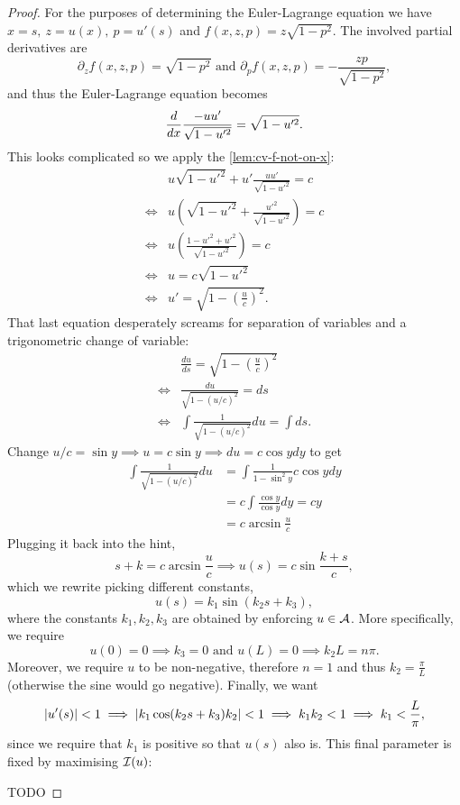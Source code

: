 \begin{proof}
  For the purposes of determining the Euler-Lagrange equation we have $x = s,\
  z = u(x),\ p = u'(s)$ and $f(x, z, p) = z\sqrt{1 - p^2}$. The involved
  partial derivatives are
  \[
    \partial_z f(x, z, p) = \sqrt{1 - p^2} \text{ and }
    \partial_p f(x, z, p) = - \frac{zp}{\sqrt{1 - p^2}},
  \]
  and thus the Euler-Lagrange equation becomes
  \[
    \frac{d}{dx} \frac{- u u'}{\sqrt{1 - u'^2}} = \sqrt{1 - u'^2}.
  \]
  This looks complicated so we apply the \autoref{lem:cv-f-not-on-x}:
  \begin{align*}
    & u\sqrt{1 - u'^2} + u' \frac{uu'}{\sqrt{1 - u'^2}} = c \\
    \iff & u \left( \sqrt{1 - u'^2} + \frac{u'^2}{\sqrt{1 - u'^2}}\right) = c \\
    \iff & u \left( \frac{1 - u'^2 + u'^2}{\sqrt{1 - u'^2}}\right) = c \\
    \iff & u = c\sqrt{1 - u'^2} \\
    \iff & u' = \sqrt{1 - \left( \frac{u}{c} \right)^2}.
  \end{align*}
  That last equation desperately screams for separation of variables and a
  trigonometric change of variable:
  \begin{align*}
    & \frac{du}{ds} = \sqrt{1 - \left( \frac{u}{c} \right)^2} \\
    \iff &\frac{du}{\sqrt{1 - (u/c)^2}} = ds \\
    \iff & \int \frac{1}{\sqrt{1 - (u/c)^2}} du = \int ds.
  \end{align*}
  Change $u / c = \sin y \implies u = c\sin y \implies du = c\cos y dy$ to get
  \begin{align*}
    \int \frac{1}{\sqrt{1 - (u/c)^2}} du
  & = \int \frac{1}{1 - \sin^2 y} c \cos y dy \\
  &= c \int \frac{\cos y}{\cos y} dy = cy \\
  &= c\arcsin\frac{u}{c}
  \end{align*}
  Plugging it back into the hint,
  \[
    s + k = c\arcsin\frac{u}{c} \implies u(s) = c\sin \frac{k+s}{c},
  \]
  which we rewrite picking different constants,
  \[
    u(s) = k_1 \sin( k_2 s + k_3),
  \]
  where the constants $k_1, k_2, k_3$ are obtained by enforcing $u \in \mathcal{A}$.
  More specifically, we require
  \[
    u(0) = 0 \implies k_3 = 0\text{ and } u(L) = 0 \implies k_2 L = n\pi.
  \]
  Moreover, we require $u$ to be non-negative, therefore $n = 1$ and thus $k_2
  = \frac{\pi}{L}$ (otherwise the sine would go negative). Finally, we want
  \[
    \left\vert{u'(s)}\right\vert < 1 \implies \left\vert{k_1\cos(k_2s + k_3) k_2}\right\vert < 1
    \implies k_1 k_2 < 1 \implies k_1 < \frac{L}{\pi},
  \]
  since we require that $k_1$ is positive so that $u(s)$ also is. This final
  parameter is fixed by maximising $\mathcal{I}(u)$:

  TODO
\end{proof}


